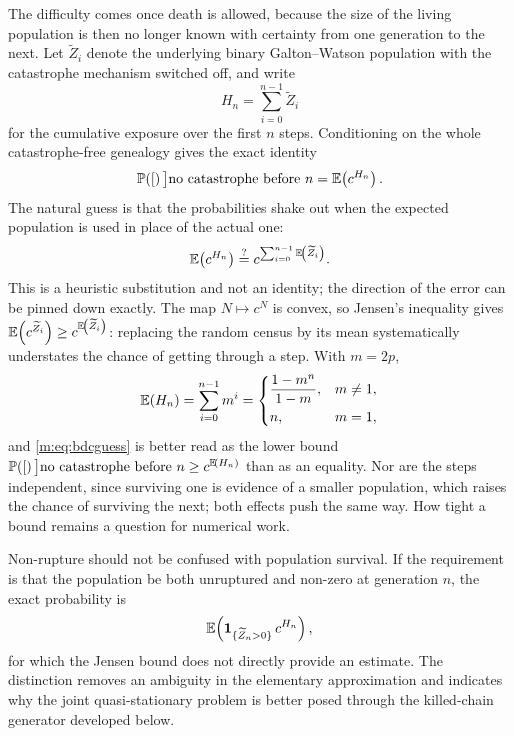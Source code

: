 The difficulty comes once death is allowed, because the size of the living
population is then no longer known with certainty from one generation to the
next. Let $\widetilde Z_i$ denote the underlying binary Galton--Watson
population with the catastrophe mechanism switched off, and write
\begin{equation}
\label{m:eq:Hn}
H_n = \sum_{i=0}^{n-1}\widetilde Z_i
\end{equation}
for the cumulative exposure over the first $n$ steps. Conditioning on the whole
catastrophe-free genealogy gives the exact identity
\begin{equation}
\label{m:eq:noruptureexact}
\mathbb{P}\!\left([\right)\big]{\text{no catastrophe before }n}
= \mathbb{E}\!\left(c^{H_n}\right) .
\end{equation}
The natural guess is that the probabilities shake out when the expected
population is used in place of the actual one:
\begin{equation}
\label{m:eq:bdcguess}
\mathbb{E}\!\left(c^{H_n}\right) \overset{?}{=} c^{\sum_{i=0}^{n-1}\mathbb{E}\!\left(\widetilde Z_i\right)} .
\end{equation}
This is a heuristic substitution and not an identity; the direction of the error
can be pinned down exactly. The map $N\mapsto c^N$ is convex, so Jensen's
inequality gives $\mathbb{E}\!\left(c^{\widetilde Z_i}\right)\ge c^{\mathbb{E}\!\left(\widetilde Z_i\right)}$: replacing
the random census by its mean systematically understates the chance of getting
through a step. With $m=2p$,
\begin{equation}
\label{m:eq:meanexposure}
\mathbb{E}\!\left(H_n\right) = \sum_{i=0}^{n-1}m^i
= \begin{cases}
\dfrac{1-m^n}{1-m}, & m\neq1,\\[2mm]
n, & m=1,
\end{cases}
\end{equation}
and \cref{m:eq:bdcguess} is better read as the lower bound
$\mathbb{P}\!\left([\right)\big]{\text{no catastrophe before }n}\ge c^{\mathbb{E}\!\left(H_n\right)}$ than as an equality.
Nor are the steps independent, since surviving one is evidence of a smaller
population, which raises the chance of surviving the next; both effects push the
same way. How tight a bound remains a question for numerical work.

Non-rupture should not be confused with population survival. If the requirement
is that the population be both unruptured and non-zero at generation $n$, the
exact probability is
\begin{equation}
\label{m:eq:jointsurvival}
\mathbb{E}\!\left(\mathbf{1}_{\{\widetilde Z_n>0\}}\,c^{H_n}\right),
\end{equation}
for which the Jensen bound does not directly provide an estimate. The
distinction removes an ambiguity in the elementary approximation and indicates
why the joint quasi-stationary problem is better posed through the
killed-chain generator developed below.

